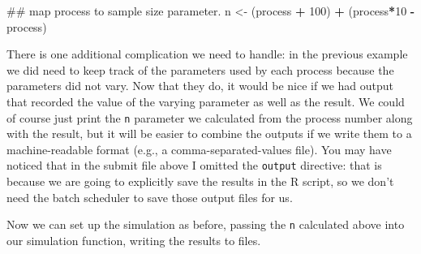 \documentclass[]{book}
\newenvironment{Shaded}{\begin{snugshade}}{\end{snugshade}}
\newcommand{\KeywordTok}[1]{\textcolor[rgb]{0.13,0.29,0.53}{\textbf{#1}}}
\newcommand{\DataTypeTok}[1]{\textcolor[rgb]{0.13,0.29,0.53}{#1}}
\newcommand{\DecValTok}[1]{\textcolor[rgb]{0.00,0.00,0.81}{#1}}
\newcommand{\StringTok}[1]{\textcolor[rgb]{0.31,0.60,0.02}{#1}}
\newcommand{\ControlFlowTok}[1]{\textcolor[rgb]{0.13,0.29,0.53}{\textbf{#1}}}
\newcommand{\OperatorTok}[1]{\textcolor[rgb]{0.81,0.36,0.00}{\textbf{#1}}}
\newcommand{\NormalTok}[1]{#1}
\begin{document}
\begin{enumerate}
\begin{Shaded}
\begin{Highlighting}[]
\NormalTok{## map process to sample size parameter.}
\NormalTok{n <-}\StringTok{ }\NormalTok{(process }\OperatorTok{+}\StringTok{ }\DecValTok{100}\NormalTok{) }\OperatorTok{+}\StringTok{ }\NormalTok{(process}\OperatorTok{*}\DecValTok{10} \OperatorTok{-}\StringTok{ }\NormalTok{process)}
\end{Highlighting}
\end{Shaded}

  There is one additional complication we need to handle: in the
  previous example we did need to keep track of the parameters used by
  each process because the parameters did not vary. Now that they do, it
  would be nice if we had output that recorded the value of the varying
  parameter as well as the result. We could of course just print the
  \texttt{n} parameter we calculated from the process number along with
  the result, but it will be easier to combine the outputs if we write
  them to a machine-readable format (e.g., a comma-separated-values
  file). You may have noticed that in the submit file above I omitted
  the \texttt{output} directive: that is because we are going to
  explicitly save the results in the R script, so we don't need the
  batch scheduler to save those output files for us.

  Now we can set up the simulation as before, passing the \texttt{n}
  calculated above into our simulation function, writing the results to
  files.

\begin{Shaded}
\end{Shaded}
\end{enumerate}
\end{document}
